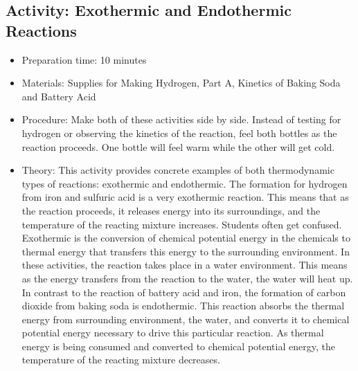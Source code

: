 \begin{itemize}
{\begin{itemize}
\begin{itemize}
{\subsection{Activity: Exothermic and Endothermic Reactions}
\begin{itemize}
\item{Preparation time: 10 minutes}
\item{Materials: Supplies for Making Hydrogen, Part A, Kinetics of Baking Soda and Battery Acid}
\item{Procedure: Make both of these activities side by side. Instead of testing for hydrogen or observing the kinetics of the reaction, feel both bottles as the reaction proceeds. One bottle will feel warm while the other will get cold. }
\item{Theory: This activity provides concrete examples of both thermodynamic types of reactions: exothermic and endothermic. The formation for hydrogen from iron and sulfuric acid is a very exothermic reaction. This means that as the reaction proceeds, it releases energy into its surroundings, and the temperature of the reacting mixture increases. Students often get confused. Exothermic is the conversion of chemical potential energy in the chemicals to thermal energy that transfers this energy to the surrounding environment. In these activities, the reaction takes place in a water environment. This means as the energy transfers from the reaction to the water, the water will heat up. In contrast to the reaction of battery acid and iron, the formation of carbon dioxide from baking soda is endothermic. This reaction absorbs the thermal energy from surrounding environment, the water, and converts it to chemical potential energy necessary to drive this particular reaction. As thermal energy is being consumed and converted to chemical potential energy, the temperature of the reacting mixture decreases.}
\end{itemize}

}
\end{itemize}
\end{itemize}}
\end{itemize}
